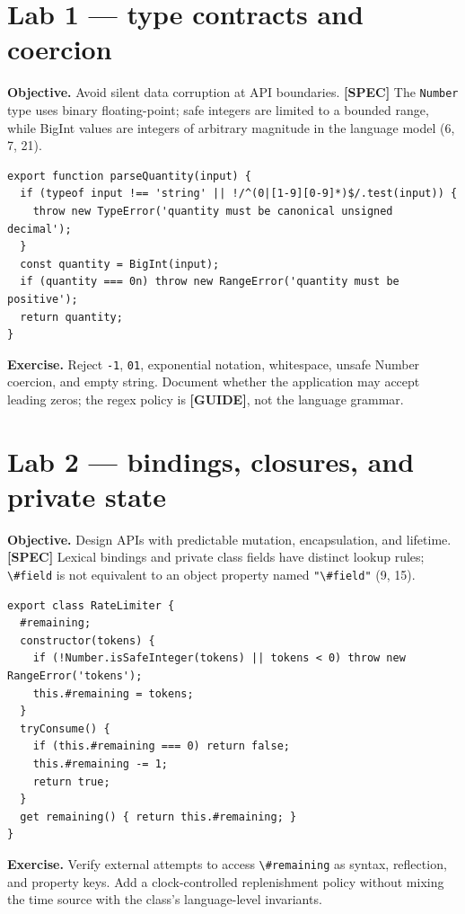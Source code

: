 \documentclass[11pt,letterpaper]{article}
\newcommand{\passthrough}[1]{#1}
\begin{document}
\section{Lab 1 --- type contracts and coercion}\label{lab-1-type-contracts-and-coercion}

\textbf{Objective.} Avoid silent data corruption at API boundaries. \textbf{{[}SPEC{]}} The \passthrough{\lstinline!Number!} type uses binary floating-point; safe integers are limited to a bounded range, while BigInt values are integers of arbitrary magnitude in the language model (6, 7, 21).

\begin{lstlisting}
export function parseQuantity(input) {
  if (typeof input !== 'string' || !/^(0|[1-9][0-9]*)$/.test(input)) {
    throw new TypeError('quantity must be canonical unsigned decimal');
  }
  const quantity = BigInt(input);
  if (quantity === 0n) throw new RangeError('quantity must be positive');
  return quantity;
}
\end{lstlisting}

\textbf{Exercise.} Reject \passthrough{\lstinline!-1!}, \passthrough{\lstinline!01!}, exponential notation, whitespace, unsafe Number coercion, and empty string. Document whether the application may accept leading zeros; the regex policy is \textbf{{[}GUIDE{]}}, not the language grammar.

\section{Lab 2 --- bindings, closures, and private state}\label{lab-2-bindings-closures-and-private-state}

\textbf{Objective.} Design APIs with predictable mutation, encapsulation, and lifetime. \textbf{{[}SPEC{]}} Lexical bindings and private class fields have distinct lookup rules; \passthrough{\lstinline!\#field!} is not equivalent to an object property named \passthrough{\lstinline!"\#field"!} (9, 15).

\begin{lstlisting}
export class RateLimiter {
  #remaining;
  constructor(tokens) {
    if (!Number.isSafeInteger(tokens) || tokens < 0) throw new RangeError('tokens');
    this.#remaining = tokens;
  }
  tryConsume() {
    if (this.#remaining === 0) return false;
    this.#remaining -= 1;
    return true;
  }
  get remaining() { return this.#remaining; }
}
\end{lstlisting}

\textbf{Exercise.} Verify external attempts to access \passthrough{\lstinline!\#remaining!} as syntax, reflection, and property keys. Add a clock-controlled replenishment policy without mixing the time source with the class's language-level invariants.
\end{document}

